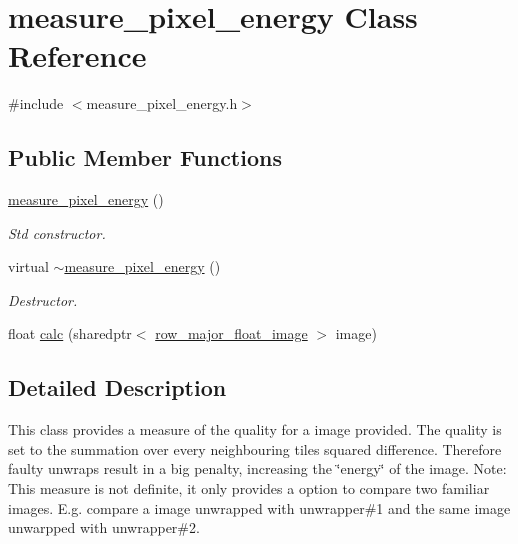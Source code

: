 \hypertarget{classmeasure__pixel__energy}{\section{measure\-\_\-pixel\-\_\-energy Class Reference}
\label{classmeasure__pixel__energy}
}


{\ttfamily \#include $<$measure\-\_\-pixel\-\_\-energy.\-h$>$}

\subsection*{Public Member Functions}
\begin{DoxyCompactItemize}
\item 
\hypertarget{classmeasure__pixel__energy_aa9963e55dd7af85c1935775973c75975}{\hyperlink{classmeasure__pixel__energy_aa9963e55dd7af85c1935775973c75975}{measure\-\_\-pixel\-\_\-energy} ()}\label{classmeasure__pixel__energy_aa9963e55dd7af85c1935775973c75975}

\begin{DoxyCompactList}\small\item\em Std constructor. \end{DoxyCompactList}\item 
\hypertarget{classmeasure__pixel__energy_aa363a45d7c89bd76509b384d0597cfb8}{virtual \hyperlink{classmeasure__pixel__energy_aa363a45d7c89bd76509b384d0597cfb8}{$\sim$measure\-\_\-pixel\-\_\-energy} ()}\label{classmeasure__pixel__energy_aa363a45d7c89bd76509b384d0597cfb8}

\begin{DoxyCompactList}\small\item\em Destructor. \end{DoxyCompactList}\item 
float \hyperlink{classmeasure__pixel__energy_af74ec0c136a474c85102a292c157a5a9}{calc} (sharedptr$<$ \hyperlink{classrow__major__float__image}{row\-\_\-major\-\_\-float\-\_\-image} $>$ image)
\end{DoxyCompactItemize}


\subsection{Detailed Description}
This class provides a measure of the quality for a image provided. The quality is set to the summation over every neighbouring tiles squared difference. Therefore faulty unwraps result in a big penalty, increasing the \char`\"{}energy\char`\"{} of the image. Note\-: This measure is not definite, it only provides a option to compare two familiar images. E.\-g. compare a image unwrapped with unwrapper\#1 and the same image unwarpped with unwrapper\#2. 


